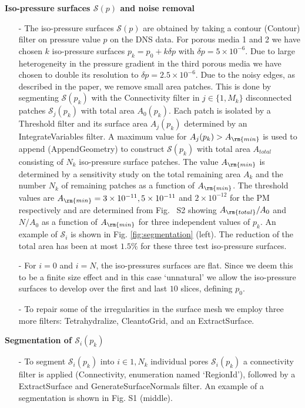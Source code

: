 \documentclass[draft,jgrga]{agutexSI2019}
\begin{document}
\begin{article}
\noindent\textbf{Iso-pressure surfaces $\mathcal{S}(p)$ and noise removal}
\begin{itemize}
	\item[-]The iso-pressure surfaces $\mathcal{S}(p)$ are obtained by taking a contour (Contour) filter on pressure value $p$ on the DNS data. For porous media 1 and 2 we have chosen $k$ iso-pressure surfaces $p_k = p_0+ k \delta p$ with $ \delta p= 5\times 10^{-6}$. Due to large heterogeneity in the pressure gradient in the third porous media we have chosen to double its resolution to $\delta p = 2.5\times 10^{-6}$. Due to the noisy edges, as described in the paper, we remove small area patches. This is done by segmenting $\mathcal{S}(p_k)$ with the Connectivity filter in $j\in \{1,M_k\}$ disconnected patches $\mathcal{S}_j(p_k)$ with total area $A_0(p_k)$. Each patch is isolated by a Threshold filter and its surface area $A_j(p_k)$ determined by an IntegrateVariables filter. A maximum value for $A_j(p_k)> A_{\rm{min}}$ is used to append (AppendGeometry) to construct $\mathcal{S}(p_k)$ with total area $A_{total}$ consisting of $N_k$ iso-pressure surface patches. The value  $A_{\rm{min}}$ is determined by a sensitivity study on the total remaining area $A_k$ and the number $N_k$ of remaining patches as a function of $ A_{\rm{min}}$. The threshold values are $A_{\rm{min}} = 3\times10^{-11}, 5\times10^{-11} $ and $2\times10^{-12}$ for the PM respectively and are determined from Fig.~ S2 showing $A_{\rm{total}}/A_0$ and $N/A_0$ as a function of $A_{\rm{min}}$ for three independent values of $p_k$. An example of $\mathcal{S}_i$ is shown in Fig. \ref{fig:segmentation} (left). The reduction of the total area has been at most $1.5\%$ for these three test iso-pressure surfaces.
	\item[-]For $i=0$ and $i=N$, the iso-pressures surfaces are flat. Since we deem this to be a finite size effect and in this case `unnatural' we allow the iso-pressure surfaces to develop over the first and last $10$ slices, defining $p_0$.
	\item[-]To repair some of the irregularities in the surface mesh we employ three more filters: Tetrahydralize, CleantoGrid, and an ExtractSurface.
\end{itemize}
\noindent\textbf{Segmentation of $\mathcal{S}_i(p_k)$}
\begin{itemize} 
	\item[-]To segment $\mathcal{S}_i(p_k)$ into $i\in{1,N_k}$ individual pores $\mathcal{S}_i(p_k)$ a connectivity filter is applied (Connectivity, enumeration named `RegionId'), followed by a ExtractSurface and GenerateSurfaceNormals filter. An example of a segmentation is shown in Fig. S1 (middle).

\end{itemize}
\end{article}
\end{document}
